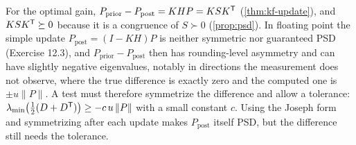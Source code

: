 \begin{solutions}
  \item For the optimal gain, $P_{\mathrm{prior}} - P_{\mathrm{post}} = KHP = KSK^{\mathsf{T}}$ (\cref{thm:kf-update}), and $KSK^{\mathsf{T}} \succeq 0$ because it is a congruence of $S \succ 0$
        (\cref{prop:psd}). In floating point the simple update $P_{\mathrm{post}} = (I - KH)P$ is neither symmetric nor guaranteed PSD (Exercise 12.3), and
        $P_{\mathrm{prior}} - P_{\mathrm{post}}$ then has rounding-level asymmetry and can have slightly negative eigenvalues, notably in directions the
        measurement does not observe, where the true difference is exactly zero and the computed one is $\pm u\|P\|$. A test must therefore symmetrize the
        difference and allow a tolerance: $\lambda_{\min}\big(\tfrac12(D + D^{\mathsf{T}})\big) \ge -c\,u\,\|P\|$ with a small constant $c$. Using the Joseph form and
        symmetrizing after each update makes $P_{\mathrm{post}}$ itself PSD, but the difference still needs the tolerance.
\end{solutions}
